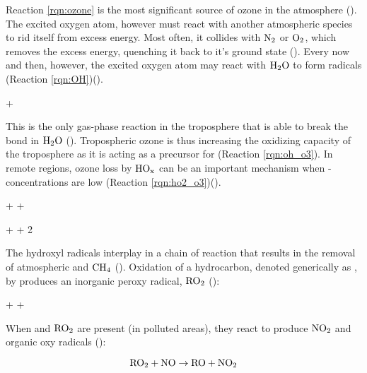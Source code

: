 Reaction \ref{rqn:ozone} is the most significant source of ozone in the atmosphere (\cite{SeinfeldSpyros}). The excited oxygen atom, however must react with another atmospheric species to rid itself from excess energy. Most often, it collides with $\mathrm{N_2}$ or $\mathrm{O_2}$, which removes the excess energy, quenching it back to it's ground state (\cite{Levy1971}). Every now and then, however, the excited oxygen atom may react with $\mathrm{H_2O}$ to form  radicals (Reaction \ref{rqn:OH})(\cite{SeinfeldSpyros}). 

\begin{reaction}
     +  
    \label{rqn:OH}
\end{reaction}

This is the only gas-phase reaction in the troposphere that is able to break the  bond in $\mathrm{H_2O}$ (\cite{SeinfeldSpyros}). Tropospheric ozone is thus increasing the oxidizing capacity of the troposphere as it is acting as a precursor for  (Reaction \ref{rqn:oh_o3}). In remote regions, ozone loss by $\mathrm{HO_x}$ can be an important mechanism when -concentrations are low (Reaction \ref{rqn:ho2_o3})(\cite{Jacob1999}). 


\begin{reaction}
     +  \rightarrow {} + 
    \label{rqn:oh_o3}
\end{reaction}
\begin{reaction}
     +  \rightarrow {} + 2
    \label{rqn:ho2_o3}
\end{reaction}

The hydroxyl radicals interplay in a chain of reaction that results in the removal of atmospheric  and $\mathrm{CH_4}$ (\cite{Levy1971}). Oxidation of a hydrocarbon, denoted generically as , by  produces an inorganic peroxy radical, $\mathrm{RO_2}$ (\cite{Jacob1999}):

\begin{reaction}
     +    + 
\end{reaction}

When  and $\mathrm{RO_2}$ are present (in polluted areas), they react to produce $\mathrm{NO_2}$ and organic oxy radicals  (\cite{Jacob1999}): 

\begin{equation}
    \mathrm{RO_2} + \mathrm{NO} \rightarrow \mathrm{RO} + \mathrm{NO_2}
\end{equation}

